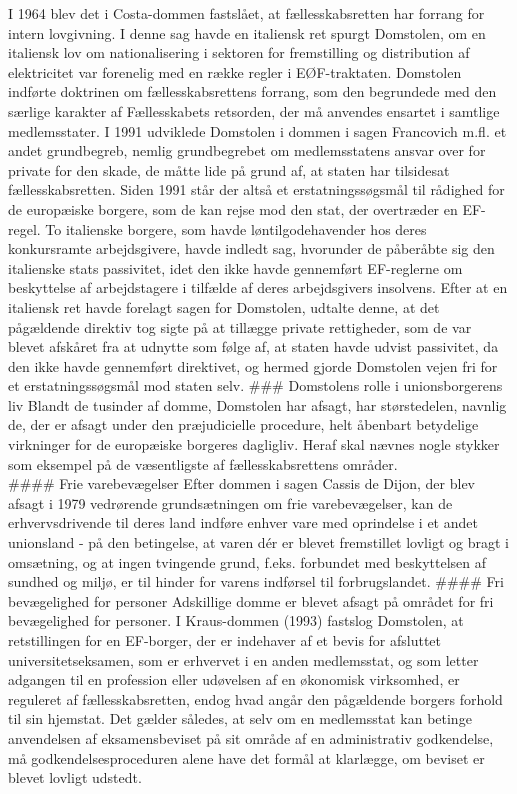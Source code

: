\documentclass[]{book}
\begin{document}
I 1964 blev det i Costa-dommen fastslået, at fællesskabsretten har forrang for intern lovgivning. I denne sag havde en italiensk ret spurgt Domstolen, om en italiensk lov om nationalisering i sektoren for fremstilling og distribution af elektricitet var forenelig med en række regler i EØF-traktaten. Domstolen indførte doktrinen om fællesskabsrettens forrang, som den begrundede med den særlige karakter af Fællesskabets retsorden, der må anvendes ensartet i samtlige medlemsstater.
I 1991 udviklede Domstolen i dommen i sagen Francovich m.fl. et andet grundbegreb, nemlig grundbegrebet om medlemsstatens ansvar over for private for den skade, de måtte lide på grund af, at staten har tilsidesat fællesskabsretten. Siden 1991 står der altså et erstatningssøgsmål til rådighed for de europæiske borgere, som de kan rejse mod den stat, der overtræder en EF-regel.
To italienske borgere, som havde løntilgodehavender hos deres konkursramte arbejdsgivere, havde indledt sag, hvorunder de påberåbte sig den italienske stats passivitet, idet den ikke havde gennemført EF-reglerne om beskyttelse af arbejdstagere i tilfælde af deres arbejdsgivers insolvens. Efter at en italiensk ret havde forelagt sagen for Domstolen, udtalte denne, at det pågældende direktiv tog sigte på at tillægge private rettigheder, som de var blevet afskåret fra at udnytte som følge af, at staten havde udvist passivitet, da den ikke havde gennemført direktivet, og hermed gjorde Domstolen vejen fri for et erstatningssøgsmål mod staten selv.
\#\#\# Domstolens rolle i unionsborgerens liv
Blandt de tusinder af domme, Domstolen har afsagt, har størstedelen, navnlig de, der er afsagt under den præjudicielle procedure, helt åbenbart betydelige virkninger for de europæiske borgeres dagligliv. Heraf skal nævnes nogle stykker som eksempel på de væsentligste af fællesskabsrettens områder.\\
\#\#\#\# Frie varebevægelser
Efter dommen i sagen Cassis de Dijon, der blev afsagt i 1979 vedrørende grundsætningen om frie varebevægelser, kan de erhvervsdrivende til deres land indføre enhver vare med oprindelse i et andet unionsland - på den betingelse, at varen dér er blevet fremstillet lovligt og bragt i omsætning, og at ingen tvingende grund, f.eks. forbundet med beskyttelsen af sundhed og miljø, er til hinder for varens indførsel til forbrugslandet.
\#\#\#\# Fri bevægelighed for personer
Adskillige domme er blevet afsagt på området for fri bevægelighed for personer.
I Kraus-dommen (1993) fastslog Domstolen, at retstillingen for en EF-borger, der er indehaver af et bevis for afsluttet universitetseksamen, som er erhvervet i en anden medlemsstat, og som letter adgangen til en profession eller udøvelsen af en økonomisk virksomhed, er reguleret af fællesskabsretten, endog hvad angår den pågældende borgers forhold til sin hjemstat. Det gælder således, at selv om en medlemsstat kan betinge anvendelsen af eksamensbeviset på sit område af en administrativ godkendelse, må godkendelsesproceduren alene have det formål at klarlægge, om beviset er blevet lovligt udstedt.
\end{document}

